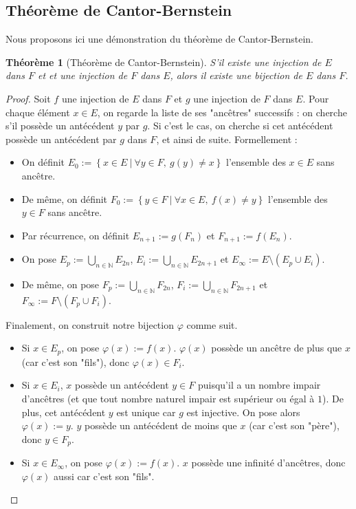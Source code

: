 \documentclass[french]{book}
\newcommand{\N}{\mathbb{N}}
\theoremstyle{plain}
\newtheorem{thm}{Théorème}[chapter]
\theoremstyle{definition}
\theoremstyle{remark}
\begin{document}
\subsection{Théorème de Cantor-Bernstein}
Nous proposons ici une démonstration du théorème de Cantor-Bernstein.
\begin{thm}[Théorème de Cantor-Bernstein]
	S'il existe une injection de $E$ dans $F$ et et une injection de $F$ dans $E$, alors il existe une bijection de $E$ dans $F$.
\end{thm}
\begin{proof}
	Soit $f$ une injection de $E$ dans $F$ et $g$ une injection de $F$ dans $E$. Pour chaque élément $x\in E$, on regarde la liste de ses "ancêtres" successifs : on cherche s'il possède un antécédent $y$ par $g$. Si c'est le cas, on cherche si cet antécédent possède un antécédent par $g$ dans $F$, et ainsi de suite. Formellement :
	\begin{itemize}
		\item On définit $E_0:=\left\{x\in E\ | \ \forall y\in F,\ g(y)\ne x\right\}$ l'ensemble des $x\in E$ sans ancêtre.
		\item De même, on définit $F_0:=\left\{y\in F\ | \ \forall x\in E,\ f(x)\ne y\right\}$ l'ensemble des $y\in F$ sans ancêtre.
		\item Par récurrence, on définit $E_{n+1}:=g(F_n)$ et $F_{n+1}:=f(E_n)$.
		\item On pose $\displaystyle E_p:=\bigcup_{n\in\N}E_{2n}$, $\displaystyle E_i:=\bigcup_{n\in\N}E_{2n+1}$ et $\displaystyle E_{\infty}:=E\setminus(E_p\cup E_i)$.
		\item De même, on pose $\displaystyle F_p:=\bigcup_{n\in\N}F_{2n}$, $\displaystyle F_i:=\bigcup_{n\in\N}F_{2n+1}$ et $\displaystyle F_{\infty}:=F\setminus(F_p\cup F_i)$.
	\end{itemize}
	Finalement, on construit notre bijection $\varphi$ comme suit.
	\begin{itemize}
		\item Si $x\in E_p$, on pose $\varphi(x):=f(x)$. $\varphi(x)$ possède un ancêtre de plus que $x$ (car c'est son "fils"), donc $\varphi(x)\in F_i$.
		\item Si $x\in E_i$, $x$ possède un antécédent $y\in F$ puisqu'il a un nombre impair d'ancêtres (et que tout nombre naturel impair est supérieur ou égal à $1$). De plus, cet antécédent $y$ est unique car $g$ est injective. On pose alors $\varphi(x):=y$. $y$ possède un antécédent de moins que $x$ (car c'est son "père"), donc $y\in F_p$.
		\item Si $x\in E_{\infty}$, on pose $\varphi(x):=f(x)$. $x$ possède une infinité d'ancêtres, donc $\varphi(x)$ aussi car c'est son "fils".

\end{itemize}
\end{proof}
\end{document}
